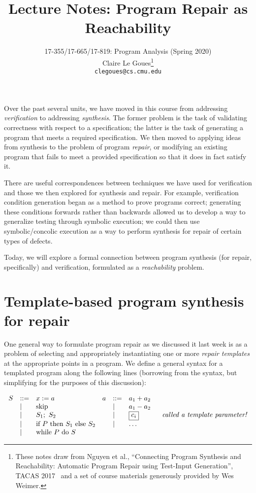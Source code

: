 \documentclass[11pt]{article}
\title{Lecture Notes: Program Repair as Reachability}
\author{17-355/17-665/17-819: Program Analysis (Spring 2020)\\
  Claire Le Goues\footnote{These notes draw from Nguyen et al., ``Connecting
    Program Synthesis and Reachability: Automatic Program Repair using
    Test-Input Generation'', TACAS 2017~\cite{tacas2017} and
    a set of course materials generously provided by Wes Weimer.}\\
  {\tt clegoues@cs.cmu.edu}}
\date{}
\begin{document}
\maketitle

Over the past several units, we have moved in this course from addressing
\emph{verification} to addressing \emph{synthesis}.  The former problem is the
task of validating correctness with respect to a specification; the latter
is the task of generating a program that meets a required specification.  We then
moved to applying ideas from synthesis to the problem of program \emph{repair},
or modifying an existing program that fails to meet a provided specification so
that it does in fact satisfy it. 

There are useful correspondences between
techniques we have used for verification and those we then explored for
synthesis and repair.  For example, verification condition generation began as a
method to prove programs correct; generating these conditions forwards rather
than backwards allowed us to develop a way to generalize testing through
symbolic execution; we could then use symbolic/concolic execution as a way to
perform synthesis for repair of certain types of defects.  

Today, we will explore a formal connection between program synthesis (for
repair, specifically) and verification, formulated as a \emph{reachability}
problem.  

\section{Template-based program synthesis for repair}

One general way to formulate program repair as we discussed it last week is as a
problem of selecting and appropriately instantiating one or more \emph{repair
  templates} at the appropriate points in a program. We define a general syntax
for a templated program along the following lines (borrowing from the \WhileLang
syntax, but simplifying for the purposes of this discussion):


\newcommand\df{\bnfdef}
\newcommand\da{\bnfalt}
\newcommand\skips{\mbox{skip}}
\newcommand\ifs{\mbox{if}~ P ~\mbox{then}~ S_1 ~\mbox{else}~ S_2}
\newcommand\whiles{\mbox{while}~ P ~\mbox{do}~ S}

\[
\begin{array}{llllllllllllll}

S & \df & x := a    & a & \df & a_1 + a_2 \\
  & \da & \skips    &   & \da & a_1 - a_2 \\ 
  & \da & S_1;~ S_2 &   & \da & \fbox{$\displaystyle c_i $}  & \mbox{~~\emph{called a template parameter!}}\\
  & \da & \ifs      &   & \da & \ldots \\
  & \da & \whiles   &   & \\
\end{array}
\]
\end{document}
